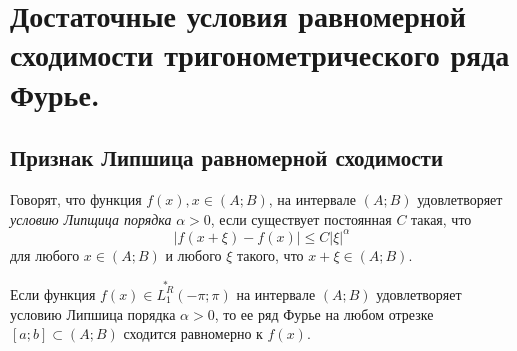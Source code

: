 \chapter{Достаточные условия равномерной сходимости тригонометрического ряда Фурье.}
\section{Признак Липшица равномерной сходимости}
Говорят, что функция $f(x), x \in (A;B)$, на интервале $(A;B)$ удовлетворяет \textit{условию Липщица порядка} $\alpha > 0$, если существует постоянная $C$ такая, что
$$
|f(x+\xi) - f(x)| \le C|\xi|^{\alpha}
$$
для любого $x \in (A;B)$ и любого $\xi$ такого, что $x + \xi \in (A;B)$.

\begin{thm}  \label{ch18thm1}
Если функция $f(x) \in \overset{*}{L^{R}_1}(-\pi;\pi)$ на интервале $(A;B)$ удовлетворяет условию Липшица порядка $\alpha > 0$, то ее ряд Фурье на любом отрезке $[a;b] \subset (A;B)$ сходится равномерно к $f(x)$.
\end{thm}
